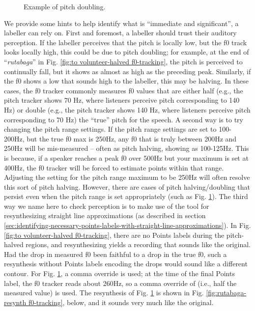 \documentclass[11pt, twoside]{memoir}
\def\textlabel#1{{\relsize{-.5}\fontspec[Mapping=tex-text]{Roboto Mono}{#1}}}
\def\langtext#1{\textit{#1}}
\begin{document}
{{{\begin{figure}[H]
\caption{Example of pitch doubling.
\label{fig:rutabaga f0-tracking}
}
\end{figure}
We provide some hints to help identify what is “immediate and significant”, a labeller can rely on.
First and foremost, a labeller should trust their auditory perception. If the labeller perceives that the pitch is locally low, but the f0 track looks locally high, this could be due to pitch doubling; for example, at the end of “\langtext{rutabaga}” in Fig. \ref{fig:to volunteer-halved f0-tracking}, the pitch is perceived to continually fall, but it shows as almost as high as the preceding peak. Similarly, if the f0 shows a low that sounds high to the labeller, this may be halving. In these cases, the f0 tracker commonly measures f0 values that are either half (e.g., the pitch tracker shows 70 Hz, where listeners perceive pitch corresponding to 140 Hz) or double (e.g., the pitch tracker shows 140 Hz, where listeners perceive pitch corresponding to 70 Hz) the “true” pitch for the speech.
A second way is to try changing the pitch range settings. If the pitch range settings are set to 100-200Hz, but the true f0 max is 250Hz, any f0 that is truly between 200Hz and 250Hz will be mis-measured – often as pitch halving, showing as 100-125Hz. This is because, if a speaker reaches a peak f0 over 500Hz but your maximum is set at 400Hz, the f0 tracker will be forced to estimate points within that range. Adjusting the setting for the pitch range maximum to be 250Hz will often resolve this sort of pitch halving. However, there are cases of pitch halving\slash doubling that persist even when the pitch range is set appropriately (such as Fig. \ref{fig:rutabaga f0-tracking}).
The third way we name here to check perception is to make use of the tool for resynthesizing straight line approximations (as described in section \ref{sec:identifying-necessary-points-labels-with-straight-line-approximations}). In Fig. \ref{fig:to volunteer-halved f0-tracking}, there are no Points labels during the pitch-halved regions, and resynthesizing yields a recording that sounds like the original. Had the drop in measured f0 been faithful to a drop in the true f0, such a resynthesis without Points labels encoding the drops would sound like a different contour. For Fig. \ref{fig:rutabaga f0-tracking}, a comma override is used; at the time of the final Points label, the f0 tracker reads about 260Hz, so a comma override of \textlabel{,130} (i.e., half the measured value) is used. The resynthesis of Fig. \ref{fig:rutabaga f0-tracking} is shown in Fig. \ref{fig:rutabaga-resynth f0-tracking}, below, and it sounds very much like the original.
}}}
\end{document}
